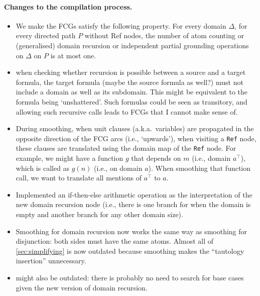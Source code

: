 \documentclass{article}
\begin{document}
\paragraph{Changes to the compilation process.}
\begin{itemize}
  \item We make the FCGs satisfy the following property. For every domain
        $\Delta$, for every directed path $P$ without Ref nodes, the number of
        atom counting or (generalised) domain recursion or independent partial
        grounding operations on $\Delta$ on $P$ is at most one.
  \item when checking whether recursion is possible between a source and a
        target formula, the target formula (maybe the source formula as well?)
        must not include a domain as well as its subdomain. This might be
        equivalent to the formula being `unshattered'. Such formulas could be
        seen as transitory, and allowing such recursive calls leads to FCGs that
        I cannot make sense of.
  \item During smoothing, when unit clauses (a.k.a.\ variables) are propagated
        in the opposite direction of the FCG arcs (i.e., `upwards'), when
        visiting a \texttt{Ref} node, these clauses are translated using the
        domain map of the \texttt{Ref} node. For example, we might have a
        function $g$ that depends on $m$ (i.e., domain $a^{\top}$), which is
        called as $g(n)$ (i.e., on domain $a$). When smoothing that function
        call, we want to translate all mentions of $a^{\top}$ to $a$.
  \item Implemented an if-then-else arithmetic operation as the interpretation
        of the new domain recursion node (i.e., there is one branch for when the
        domain is empty and another branch for any other domain size).
  \item Smoothing for domain recursion now works the same way as smoothing for
        disjunction: both sides must have the same atoms. Almost all of
        \cref{sec:simplifying} is now outdated because smoothing makes the
        ``tautology insertion'' unnecessary.
  \item {} might also be outdated: there is
        probably no need to search for base cases given the new version of
        domain recursion.
\end{itemize}
\end{document}
